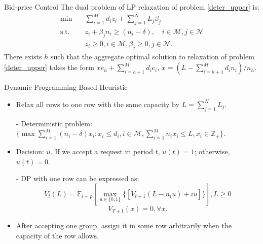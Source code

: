       \begin{frame}{Bid-price Control}
        The dual problem of LP relaxation of problem \eqref{deter_upper} is:
        \begin{equation}\label{bid-price_dual}
          \begin{aligned}
          \min \quad & \sum_{i=1}^{M} d_i z_i + \sum_{j= 1}^{N} L_j \beta_{j} \\
          \text {s.t.} \quad & z_{i} + \beta_j n_i \geq (n_i-\delta), \quad i \in \mathcal{M}, j \in \mathcal{N} \\
          & z_{i} \geq 0, i \in \mathcal{M}, \beta_{j} \geq 0, j \in \mathcal{N}.
          \end{aligned}
        \end{equation}
        \small There exists $h$ such that the aggregate optimal solution to relaxation of problem \eqref{deter_upper} takes the form $x e_{h} + \sum_{i=h+1} ^{M} d_{i} e_{i}$, $x = (L- \sum_{i = h+1}^{M} {d_i n_i})/ n_h$.

      \end{frame}

      \begin{frame}{Dynamic Programming Based Heuristic}
        \begin{itemize}
        \item Relax all rows to one row with the same capacity by $L = \sum_{j=1}^{N} L_j$.
        \item[-] Deterministic problem: $\{\max \sum_{i=1}^{M} (n_i- \delta) x_{i}: x_{i} \leq d_{i}, i \in \mathcal{M}, \sum_{i=1}^{M} n_{i} x_{i} \leq L, x_{i} \in \mathbb{Z}_{+}\}$.
        \item Decision: $u$. If we accept a request in period $t$, $u(t) = 1$; otherwise, $u(t) =0$.  
        \item[-] DP with one row can be expressed as:
        $$V_{t}(L) = \mathbb{E}_{i \sim p} [\max_{u \in \{0,1\}} \{ {[V_{t+1}(L-n_i u)+ i u]}\}], L \geq 0$$ 
        $$V_{T+1}(x) =0, \forall x.$$
        \item After accepting one group, assign it in some row arbitrarily when the capacity of the row allows.
        \end{itemize}
      \end{frame}
      

